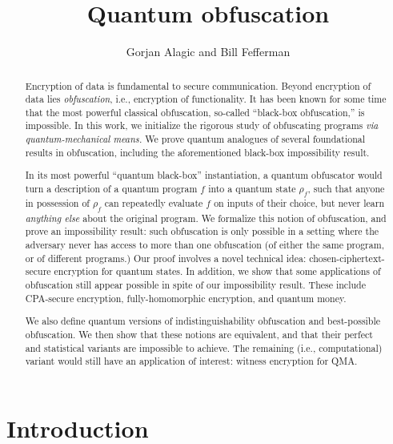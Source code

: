 \documentclass[11pt]{amsart}
\numberwithin{equation}{section}
\begin{document}
\title{Quantum obfuscation}
\author{Gorjan Alagic and Bill Fefferman}
\maketitle
\begin{abstract}
Encryption of data is fundamental to secure communication. Beyond encryption of data lies \emph{obfuscation}, i.e., encryption of functionality. It has been known for some time that the most powerful classical obfuscation, so-called ``black-box obfuscation,'' is impossible. In this work, we initialize the rigorous study of obfuscating programs \emph{via quantum-mechanical means.} We prove quantum analogues of several foundational results in obfuscation, including the aforementioned black-box impossibility result.

In its most powerful ``quantum black-box'' instantiation, a quantum obfuscator would turn a description of a quantum program $f$ into a quantum state $\rho_f$, such that anyone in possession of $\rho_f$ can repeatedly evaluate $f$ on inputs of their choice, but never learn \emph{anything else} about the original program. We formalize this notion of obfuscation, and prove an impossibility result: such obfuscation is only possible in a setting where the adversary never has access to more than one obfuscation (of either the same program, or of different programs.) Our proof involves a novel technical idea: chosen-ciphertext-secure encryption for quantum states. In addition, we show that some applications of obfuscation still appear possible in spite of our impossibility result. These include CPA-secure encryption, fully-homomorphic encryption, and quantum money. 

We also define quantum versions of indistinguishability obfuscation and best-possible obfuscation. We then show that these notions are equivalent, and that their perfect and statistical variants are impossible to achieve. The remaining (i.e., computational) variant would still have an application of interest: witness encryption for QMA.
\end{abstract}


\section{Introduction}\label{sec:intro}
\end{document}

